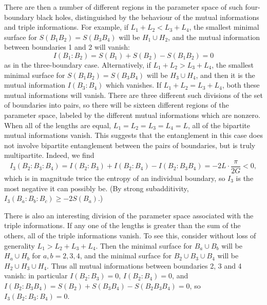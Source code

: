 \documentclass[12pt]{article}
\newcommand{\be}{\begin{equation}}
\newcommand{\ee}{\end{equation}}
\numberwithin{equation}{section}
\begin{document}
There are then a number of different regions in the parameter space of such four-boundary black holes, distinguished by the behaviour of the mutual informations and triple informations. For example, if $L_1 + L_2 < L_3 + L_4$, the smallest minimal surface for $S(B_1   B_2) = S(B_3   B_4)$ will be $H_1 \cup H_2$, and the mutual information between boundaries 1 and 2 will vanish:
%
\be
I(B_1 : B_2) = S(B_1) + S(B_2) - S(B_1   B_2) = 0
\ee
%
as in the three-boundary case. Alternatively, if $L_1 + L_2 > L_3 + L_4$, the  smallest minimal surface for $S(B_1   B_2) = S(B_3   B_4)$ will be $H_3 \cup H_4$, and then  it is the mutual information $I(B_3 : B_4)$ which vanishes. If  $L_1 + L_2 = L_3 + L_4$, both these mutual informations will vanish. There are three different such divisions of the set of boundaries into pairs, so there will be sixteen different regions of the parameter space, labeled by the different mutual informations which are nonzero. When all of the lengths are equal, $L_1 = L_2 = L_3 = L_4 = L$, all of the bipartite mutual informations vanish. This suggests that the entanglement in this case does not involve bipartite entanglement between the pairs of boundaries, but is truly multipartite. Indeed, we find
\be
\label{triple}
I_3(B_2 : B_3 : B_4)
= I(B_2 : B_3) + I(B_2 : B_4) - I(B_2: B_3   B_4)
= -2L \cdot \frac{\pi}{2G}
 < 0,
\ee
which is in magnitude twice the entropy of an individual boundary, so $I_3$ is the most negative it can possibly be. (By strong subadditivity, $I_3(B_a : B_b : B_c) \geq -2 S(B_a)$.)

There is also an interesting division of the parameter space associated with the triple informations. If any one of the lengths is greater than the sum of the others, all of the triple informations vanish. To see this, consider without loss of generality $L_1 > L_2 + L_3 + L_4$. Then the minimal surface for $B_a \cup B_b $ will be  $H_a \cup H_b$ for $a,b = 2,3,4$, and the minimal surface for $B_2 \cup B_3 \cup B_4$ will be $H_2 \cup H_3 \cup H_4$.  Thus all mutual informations between boundaries 2, 3 and 4 vanish: in particular $I(B_2 : B_3) = 0$, $I(B_2 : B_4) = 0$, and $I(B_2 : B_3   B_4) = S(B_2) + S(B_3   B_4) - S(B_2   B_3   B_4) = 0$, so $I_3(B_2:B_3:B_4) = 0$.
\end{document}
